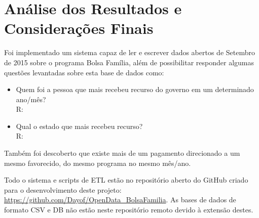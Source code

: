 \documentclass[12pt]{article}
\begin{document}
	\section{Análise dos Resultados e Considerações Finais}
	\label{sec:resultados}
	
	Foi implementado um sistema capaz de ler e escrever dados abertos de Setembro de 2015 sobre o programa Bolsa Família, além de possibilitar responder algumas questões levantadas sobre esta base de dados como:
	
	\begin{itemize}
		\item Quem foi a pessoa que mais recebeu  recurso do governo em um determinado ano/mês? \\
		R: 
		\item Qual o estado que mais recebeu recurso? \\
		R: 
	\end{itemize}
	
	Também foi descoberto que existe mais de um pagamento direcionado a um mesmo favorecido, do mesmo programa no mesmo mês/ano. 
	
	Todo o sistema e scripts de ETL estão no repositório aberto do GitHub criado para o desenvolvimento deste projeto: \url{https://github.com/Dayof/OpenData_BolsaFamilia}. As bases de dados de formato CSV e DB não estão neste repositório remoto devido à extensão destes.
	

 

	
\end{document}
